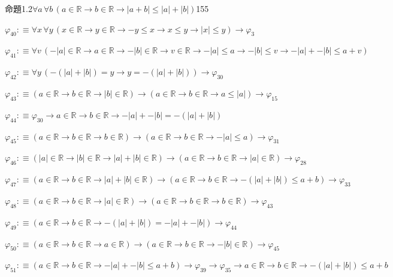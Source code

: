 \begin{fullproof}{命題1.2}{$\forall a\,\forall b\,(a \in \mathbb{R} \to b \in \mathbb{R} \to \lvert a + b \rvert \leq \lvert a \rvert + \lvert b \rvert)$}{155}
\begin{abbrevlist}
\item $\varphi_{40} :\equiv \forall x\,\forall y\,(x \in \mathbb{R} \to y \in \mathbb{R} \to -y \leq x \to x \leq y \to \lvert x \rvert \leq y) \to \varphi_{3}$
\item $\varphi_{41} :\equiv \forall v\,(-\lvert a \rvert \in \mathbb{R} \to a \in \mathbb{R} \to -\lvert b \rvert \in \mathbb{R} \to v \in \mathbb{R} \to -\lvert a \rvert \leq a \to -\lvert b \rvert \leq v \to -\lvert a \rvert + -\lvert b \rvert \leq a + v)$
\item $\varphi_{42} :\equiv \forall y\,(-(\lvert a \rvert + \lvert b \rvert) = y \to y = -(\lvert a \rvert + \lvert b \rvert)) \to \varphi_{30}$
\item $\varphi_{43} :\equiv (a \in \mathbb{R} \to b \in \mathbb{R} \to \lvert b \rvert \in \mathbb{R}) \to (a \in \mathbb{R} \to b \in \mathbb{R} \to a \leq \lvert a \rvert) \to \varphi_{15}$
\item $\varphi_{44} :\equiv \varphi_{30} \to a \in \mathbb{R} \to b \in \mathbb{R} \to -\lvert a \rvert + -\lvert b \rvert = -(\lvert a \rvert + \lvert b \rvert)$
\item $\varphi_{45} :\equiv (a \in \mathbb{R} \to b \in \mathbb{R} \to b \in \mathbb{R}) \to (a \in \mathbb{R} \to b \in \mathbb{R} \to -\lvert a \rvert \leq a) \to \varphi_{31}$
\item $\varphi_{46} :\equiv (\lvert a \rvert \in \mathbb{R} \to \lvert b \rvert \in \mathbb{R} \to \lvert a \rvert + \lvert b \rvert \in \mathbb{R}) \to (a \in \mathbb{R} \to b \in \mathbb{R} \to \lvert a \rvert \in \mathbb{R}) \to \varphi_{28}$
\item $\varphi_{47} :\equiv (a \in \mathbb{R} \to b \in \mathbb{R} \to \lvert a \rvert + \lvert b \rvert \in \mathbb{R}) \to (a \in \mathbb{R} \to b \in \mathbb{R} \to -(\lvert a \rvert + \lvert b \rvert) \leq a + b) \to \varphi_{33}$
\item $\varphi_{48} :\equiv (a \in \mathbb{R} \to b \in \mathbb{R} \to \lvert a \rvert \in \mathbb{R}) \to (a \in \mathbb{R} \to b \in \mathbb{R} \to b \in \mathbb{R}) \to \varphi_{43}$
\item $\varphi_{49} :\equiv (a \in \mathbb{R} \to b \in \mathbb{R} \to -(\lvert a \rvert + \lvert b \rvert) = -\lvert a \rvert + -\lvert b \rvert) \to \varphi_{44}$
\item $\varphi_{50} :\equiv (a \in \mathbb{R} \to b \in \mathbb{R} \to a \in \mathbb{R}) \to (a \in \mathbb{R} \to b \in \mathbb{R} \to -\lvert b \rvert \in \mathbb{R}) \to \varphi_{45}$
\item $\varphi_{51} :\equiv (a \in \mathbb{R} \to b \in \mathbb{R} \to -\lvert a \rvert + -\lvert b \rvert \leq a + b) \to \varphi_{39} \to \varphi_{35} \to a \in \mathbb{R} \to b \in \mathbb{R} \to -(\lvert a \rvert + \lvert b \rvert) \leq a + b$

\end{abbrevlist}
\end{fullproof}
